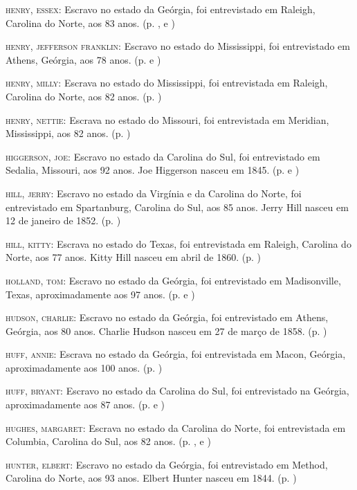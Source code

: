 \begin{Parskip}
\textsc{henry, essex:} Escravo no estado da Geórgia, foi entrevistado em
Raleigh, Carolina do Norte, aos 83 anos. (p. \pageref{ref136}, \pageref{ref137} e \pageref{ref138})

\textsc{henry, jefferson franklin:} Escravo no estado do Mississippi,
foi entrevistado em Athens, Geórgia, aos 78 anos. (p. \pageref{ref139} e \pageref{ref140})

\textsc{henry, milly:} Escrava no estado do Mississippi, foi
entrevistada em Raleigh, Carolina do Norte, aos 82 anos. (p. \pageref{ref141})

\textsc{henry, nettie:} Escrava no estado do Missouri, foi entrevistada
em Meridian, Mississippi, aos 82 anos. (p. \pageref{ref142})

\textsc{higgerson, joe:} Escravo no estado da Carolina do Sul, foi
entrevistado em Sedalia, Missouri, aos 92 anos. Joe Higgerson nasceu em
1845. (p. \pageref{ref143} e \pageref{ref144})

\textsc{hill, jerry:} Escravo no estado da Virgínia e da Carolina do
Norte, foi entrevistado em Spartanburg, Carolina do Sul, aos 85 anos.
Jerry Hill nasceu em 12 de janeiro de 1852. (p. \pageref{ref145})

\textsc{hill, kitty:} Escrava no estado do Texas, foi entrevistada em
Raleigh, Carolina do Norte, aos 77 anos. Kitty Hill nasceu em abril de
1860. (p. \pageref{ref146})

\textsc{holland, tom:} Escravo no estado da Geórgia, foi entrevistado em
Madisonville, Texas, aproximadamente aos 97 anos. (p. \pageref{ref147} e \pageref{ref148})

\textsc{hudson, charlie:} Escravo no estado da Geórgia, foi entrevistado
em Athens, Geórgia, aos 80 anos. Charlie Hudson nasceu em 27 de março de
1858. (p. \pageref{ref149})

\textsc{huff, annie:} Escrava no estado da Geórgia, foi entrevistada em
Macon, Geórgia, aproximadamente aos 100 anos. (p. \pageref{ref150})

\textsc{huff, bryant:} Escravo no estado da Carolina do Sul, foi
entrevistado na Geórgia, aproximadamente aos 87 anos. (p. \pageref{ref151} e \pageref{ref152})

\textsc{hughes, margaret:} Escrava no estado da Carolina do Norte, foi
entrevistada em Columbia, Carolina do Sul, aos 82 anos. (p. \pageref{ref153}, \pageref{ref154} e \pageref{ref155})

\textsc{hunter, elbert:} Escravo no estado da Geórgia, foi entrevistado
em Method, Carolina do Norte, aos 93 anos. Elbert Hunter nasceu em 1844. (p. \pageref{ref156})


\end{Parskip}
